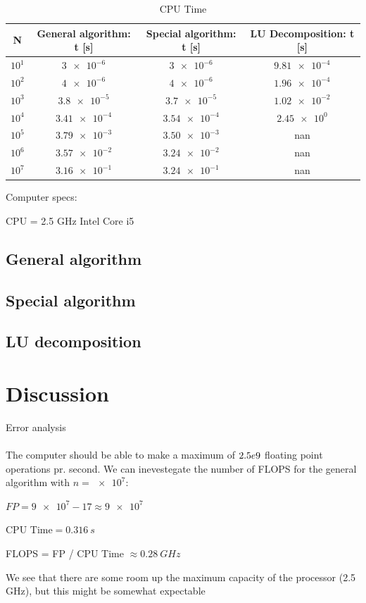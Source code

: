 \documentclass[american,a4paper,12pt]{article}
\begin{document}
  \begin{table}[H]
    \begin{center}
    \caption{CPU Time}
    \begin{tabular}{|c|c|c|c|} \hline
    \textbf{N} & \textbf{General algorithm: t [s]} & \textbf{Special algorithm: t [s]} & \textbf{LU Decomposition: t [s]} \\ \hline
    $10^1$ & $\num{3e-6}$     & $\num{3e-6}$    & $\num{9.81e-4}$ \\ \hline
    $10^2$ & $\num{4e-6}$     & $\num{4e-6}$    & $\num{1.96e-4}$ \\ \hline
    $10^3$ & $\num{3.8e-5}$   & $\num{3.7e-5}$  & $\num{1.02e-2}$ \\ \hline
    $10^4$ & $\num{3.41e-4}$  & $\num{3.54e-4}$ & $\num{2.45e0}$ \\ \hline
    $10^5$ & $\num{3.79e-3}$  & $\num{3.50e-3}$ & nan \\ \hline
    $10^6$ & $\num{3.57e-2}$  & $\num{3.24e-2}$ & nan \\ \hline
    $10^7$ & $\num{3.16e-1}$  & $\num{3.24e-1}$ & nan \\ \hline
    \end{tabular}
    \end{center}
    \label{tab:final_res}
  \end{table}

  Computer specs:
  \begin{center}
    CPU = 2.5 GHz Intel Core i5
  \end{center}


\subsection{General algorithm}

\subsection{Special algorithm}

\subsection{LU decomposition}

\section{Discussion}
Error analysis \\
\\
The computer should be able to make a maximum of $\num2.5e9$ floating point operations pr. second. We can inevestegate the number of FLOPS for the general algorithm with $n = \num{e7}$:
\begin{center}
  $FP = \num{9e7} - 17 \approx \num{9e7}$
\end{center}
\begin{center}
  $\text{CPU Time} = 0.316 \ s$
\end{center}
\begin{center}
  FLOPS = FP / CPU Time $\approx 0.28 \ GHz$
\end{center}
We see that there are some room up the maximum capacity of the processor (2.5 GHz), but this might be somewhat expectable
\end{document}
